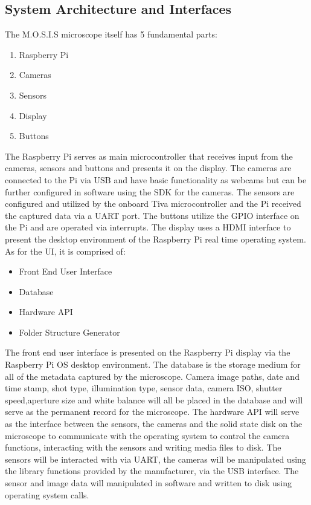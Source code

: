 \subsection{System Architecture and Interfaces}
The M.O.S.I.S microscope itself has 5 fundamental parts:
\begin{enumerate}
	\item Raspberry Pi
	\item Cameras
	\item Sensors
	\item Display
	\item Buttons
\end{enumerate}
The Raspberry Pi serves as main microcontroller that receives input from the cameras, sensors and buttons and presents it on the display.
The cameras are connected to the Pi via USB and have basic functionality as webcams but can be further configured in software using the SDK for the cameras. The sensors are configured and utilized by the onboard Tiva microcontroller and the Pi received the captured data via a UART port. The buttons utilize the GPIO interface on the Pi and are operated via interrupts. The display uses a HDMI interface to present the desktop environment of the Raspberry Pi real time operating system.\\
As for the UI, it is comprised of:
\begin{itemize}
	\item Front End User Interface
	\item Database
	\item Hardware API
	\item Folder Structure Generator
\end{itemize}
The front end user interface is presented on the Raspberry Pi display via the Raspberry Pi OS desktop environment. The database is the storage medium for all of the metadata captured by the microscope. Camera image paths, date and time stamp, shot type, illumination type, sensor data, camera ISO, shutter speed,aperture size and white balance will all be placed in the database and will serve as the permanent record for the microscope. The hardware API will serve as the interface between the sensors, the cameras and the solid state disk on the microscope to communicate with the operating system to control the camera functions, interacting with the sensors and writing media files to disk. The sensors will be interacted with via UART, the cameras will be manipulated using the library functions provided by the manufacturer, via the USB interface. The sensor and image data will manipulated in software and written to disk using operating system calls.
